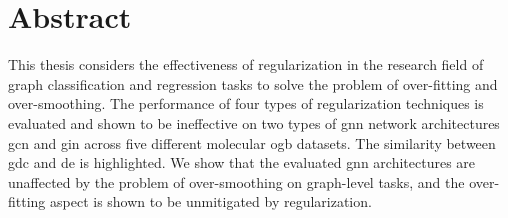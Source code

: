 %
\chapter*{Abstract}
\label{sec:abstract}
\vspace*{-10mm}

This thesis considers the effectiveness of regularization in the research field of graph classification and regression tasks to solve the problem of over-fitting and over-smoothing. %
The performance of four types of regularization techniques is evaluated and shown to be ineffective on two types of \ac{gnn} network architectures \ac{gcn} and \ac{gin} across five different molecular \ac{ogb} datasets. The similarity between \ac{gdc} and \ac{de} is highlighted.
We show that the evaluated \ac{gnn} architectures are unaffected by the problem of over-smoothing on graph-level tasks, and the over-fitting aspect is shown to be unmitigated by regularization.



